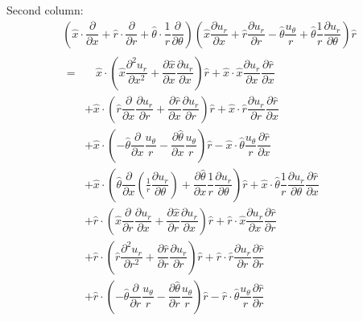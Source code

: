 \documentclass{kthreport}
\begin{document}
Second column:
\begin{eqnarray}
		\left(\hat{x}\cdot\dfrac{\partial}{\partial x} + \hat{r}\cdot\dfrac{\partial}{\partial r} + \hat{\theta}\cdot\dfrac{1}{r}\dfrac{\partial}{\partial \theta}\right)
		\left(	\hat{x}\dfrac{\partial u_{r}}{\partial x}  + \hat{r}\dfrac{\partial u_{r}}{\partial r} - \hat{\theta} \dfrac{u_{\theta}}{r} + \hat{\theta}\dfrac{1}{r}\dfrac{\partial u_{r}}{\partial \theta}
\right) \hat{r} \nonumber \\
%
	\begin{split}
	= & \quad \hat{x}\cdot\left(\hat{x}\dfrac{\partial^{2}u_{r}}{\partial x^{2}} + \dfrac{\partial \hat{x}}{\partial x}\dfrac{\partial u_{r}}{\partial x} \right)\hat{r} + \hat{x}\cdot\hat{x}\dfrac{\partial u_{r}}{\partial x}\dfrac{\partial \hat{r}}{\partial x} \\
	&+ \hat{x}\cdot\left(\hat{r}\dfrac{\partial }{\partial x}\dfrac{\partial u_{r}}{\partial r} + \dfrac{\partial \hat{r}}{\partial x}\dfrac{\partial u_{r}}{\partial r}\right)\hat{r} + \hat{x}\cdot\hat{r}\dfrac{\partial u_{r}}{\partial r}\dfrac{\partial \hat{r}}{\partial x} \\
	& + \hat{x}\cdot\left( -\hat{\theta}\dfrac{\partial }{\partial x}\dfrac{u_{\theta}}{r}	- \dfrac{\partial \hat{\theta}}{\partial x}\dfrac{u_{\theta}}{r}  \right)\hat{r}   - \hat{x}\cdot\hat{\theta}\dfrac{u_{\theta}}{r}\dfrac{\partial \hat{r}}{\partial x} \\
	&+ \hat{x}\cdot\left(\hat{\theta}\dfrac{\partial }{\partial x}\left(\frac{1}{r}\dfrac{\partial u_{r}}{\partial \theta}\right) + \dfrac{\partial \hat{\theta}}{\partial x}\dfrac{1}{r}\dfrac{\partial u_{r}}{\partial \theta} \right)\hat{r}  + \hat{x}\cdot\hat{\theta}\dfrac{1}{r}\dfrac{\partial u_{r}}{\partial \theta}\dfrac{\partial \hat{r}}{\partial x}\\
	&+ \hat{r}\cdot\left(\hat{x}\dfrac{\partial }{\partial r}\dfrac{\partial u_{r}}{\partial x}	+ \dfrac{\partial \hat{x}}{\partial r}\dfrac{\partial u_{r}}{\partial x}	\right)\hat{r} + \hat{r}\cdot\hat{x}\dfrac{\partial u_{r}}{\partial x}\dfrac{\partial \hat{r}}{\partial r} \\
	&+ \hat{r}\cdot\left(\hat{r}\dfrac{\partial^{2}u_{r}}{\partial r^{2}} + \dfrac{\partial \hat{r}}{\partial r}\dfrac{\partial u_{r}}{\partial r}\right)\hat{r} + \hat{r}\cdot\hat{r}\dfrac{\partial u_{r}}{\partial r}\dfrac{\partial \hat{r}}{\partial r}\\
	& + \hat{r}\cdot\left( -\hat{\theta}\dfrac{\partial }{\partial r}\dfrac{u_{\theta}}{r}	- \dfrac{\partial \hat{\theta}}{\partial r}\dfrac{u_{\theta}}{r} \right)\hat{r}  - \hat{r}\cdot\hat{\theta}\dfrac{u_{\theta}}{r}\dfrac{\partial \hat{r}}{\partial r}  \\

\end{split}
\end{eqnarray}
\end{document}
